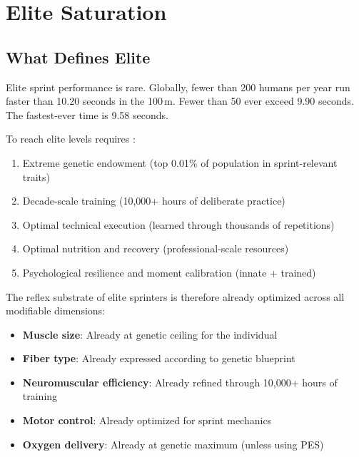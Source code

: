 \documentclass[11pt,twocolumn]{article}
\theoremstyle{definition}
\theoremstyle{remark}
\begin{document}
\section{Elite Saturation}
\label{sec:saturation}

\subsection{What Defines Elite}

Elite sprint performance is rare. Globally, fewer than 200 humans per year run faster than 10.20 seconds in the 100\,m. Fewer than 50 ever exceed 9.90 seconds. The fastest-ever time is 9.58 seconds.

To reach elite levels requires \cite{schmidt2019motor}:
\begin{enumerate}[leftmargin=1.2em]
\item Extreme genetic endowment (top 0.01\% of population in sprint-relevant traits)
\item Decade-scale training (10,000+ hours of deliberate practice) \cite{schmidt2019motor}
\item Optimal technical execution (learned through thousands of repetitions) \cite{bolt2008,novacheck1998biomechanics}
\item Optimal nutrition and recovery (professional-scale resources) \cite{weir1949new,mifflin1990new,harris1919basal,levine2005measurement}
\item Psychological resilience and moment calibration (innate + trained) \cite{kahneman2011thinking,lutz2004attention}
\end{enumerate}

The reflex substrate of elite sprinters is therefore already optimized across all modifiable dimensions:
\begin{itemize}[leftmargin=1.2em]
\item \textbf{Muscle size}: Already at genetic ceiling for the individual
\item \textbf{Fiber type}: Already expressed according to genetic blueprint
\item \textbf{Neuromuscular efficiency}: Already refined through 10,000+ hours of training
\item \textbf{Motor control}: Already optimized for sprint mechanics
\item \textbf{Oxygen delivery}: Already at genetic maximum (unless using PES)
\end{itemize}
\end{document}
